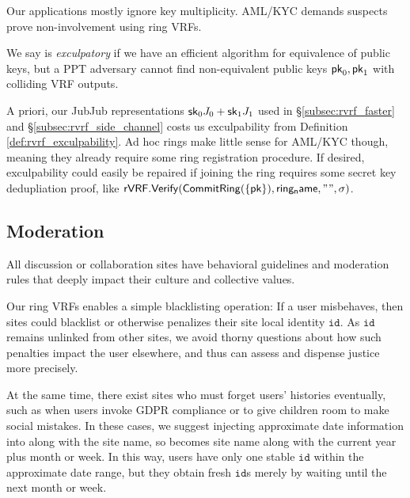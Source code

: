 Our applications mostly ignore key multiplicity. 
AML/KYC demands suspects prove non-involvement using ring VRFs.

\begin{definition}\label{def:rvrf_exculpability}
We say \rVRF is {\em exculpatory} if we have an efficient algorithm
for equivalence of public keys, but a PPT adversary \adv cannot
find non-equivalent public keys $\mathsf{pk}_0,\mathsf{pk}_1$ with colliding VRF outputs.
\end{definition}

A priori, our JubJub representations $\mathsf{sk}_0 J_0 + \mathsf{sk}_1 J_1$
used in \S\ref{subsec:rvrf_faster} and \S\ref{subsec:rvrf_side_channel}
costs us exculpability from Definition \ref{def:rvrf_exculpability}.
Ad hoc rings make little sense for AML/KYC though, meaning they already
require some ring registration procedure.
%
If desired, exculpability could easily be repaired if joining the ring
requires some secret key dedupliation proof, like 
${\mathsf{rVRF}}.{\mathsf{Verify}}({\mathsf{CommitRing}}(\{\mathsf{pk}\}),\mathsf{ring_name},\mathtt{""},\sigma)$.



\subsection{Moderation}
\label{subsec:moderation}

All discussion or collaboration sites have behavioral guidelines and
moderation rules that deeply impact their culture and collective values.

Our ring VRFs enables a simple blacklisting operation:
If a user misbehaves, then sites could blacklist or otherwise penalizes
their site local identity $\mathtt{id}$.
As $\mathtt{id}$ remains unlinked from other sites, we avoid thorny
questions about how such penalties impact the user elsewhere, and thus
can assess and dispense justice more precisely. 

At the same time, there exist sites who must forget users' histories
eventually, such as when users invoke GDPR compliance or to give children
room to make social mistakes.  In these cases, we suggest injecting
approximate date information into \msg along with the site name,
so \msg becomes site name along with the current year plus month or week.
In this way, users have only one stable $\mathtt{id}$ within the
approximate date range, but they obtain fresh $\mathtt{id}$s merely
by waiting until the next month or week.

